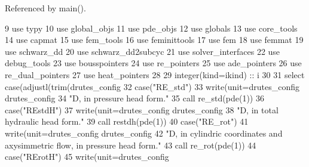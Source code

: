 Referenced by main().


\begin{DoxyCode}
9       \textcolor{keywordtype}{use }typy
10       \textcolor{keywordtype}{use }global_objs
11       \textcolor{keywordtype}{use }pde_objs
12       \textcolor{keywordtype}{use }globals
13       \textcolor{keywordtype}{use }core_tools
14       \textcolor{keywordtype}{use }capmat
15       \textcolor{keywordtype}{use }fem_tools
16       \textcolor{keywordtype}{use }feminittools
17       \textcolor{keywordtype}{use }fem
18       \textcolor{keywordtype}{use }femmat
19       \textcolor{keywordtype}{use }schwarz_dd
20       \textcolor{keywordtype}{use }schwarz_dd2subcyc
21       \textcolor{keywordtype}{use }solver_interfaces
22       \textcolor{keywordtype}{use }debug_tools
23       \textcolor{keywordtype}{use }bousspointers
24       \textcolor{keywordtype}{use }re_pointers
25       \textcolor{keywordtype}{use }ade_pointers
26       \textcolor{keywordtype}{use }re_dual_pointers
27       \textcolor{keywordtype}{use }heat_pointers
28 
29       \textcolor{keywordtype}{integer(kind=ikind)} :: i
30 
31       \textcolor{keywordflow}{select case}(adjustl(trim(drutes_config%
32         \textcolor{keywordflow}{case}(\textcolor{stringliteral}{"RE\_std"})
33           \textcolor{keyword}{write}(unit=drutes_config%
      drutes_config%
34 \textcolor{comment}{          }\textcolor{stringliteral}{"D, in pressure head form."}
35           \textcolor{keyword}{call }re_std(pde(1))
36         \textcolor{keywordflow}{case}(\textcolor{stringliteral}{"REstdH"})
37           \textcolor{keyword}{write}(unit=drutes_config%
      drutes_config%
38 \textcolor{comment}{          }\textcolor{stringliteral}{"D, in total hydraulic head form."}
39           \textcolor{keyword}{call }restdh(pde(1))
40         \textcolor{keywordflow}{case}(\textcolor{stringliteral}{"RE\_rot"})
41           \textcolor{keyword}{write}(unit=drutes_config%
      drutes_config%
42 \textcolor{comment}{          }\textcolor{stringliteral}{"D, in cylindric coordinates and axysimmetric flow, in pressure head form."}
43           \textcolor{keyword}{call }re_rot(pde(1))
44         \textcolor{keywordflow}{case}(\textcolor{stringliteral}{"RErotH"})
45           \textcolor{keyword}{write}(unit=drutes_config%

\end{DoxyCode}
